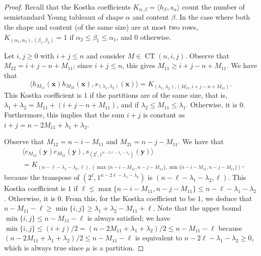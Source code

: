 \documentclass[12pt]{amsart}
\theoremstyle{plain}
\theoremstyle{definition}
\DeclareMathOperator{\CT}{CT}
\newcommand{\x}{\mathbf{x}}
\newcommand{\y}{\mathbf{y}}
\begin{document}
\begin{proof}
Recall that the Kostka coefficients $K_{\alpha,\beta} = \langle h_\beta, s_\alpha \rangle$ count the number of semistandard Young tableaux of shape $\alpha$ and content $\beta$. 
In the case where both the shape and content (of the same size) are at most two rows, $K_{(\alpha_1,\alpha_2),(\beta_1, \beta_2)} = 1$ if $\alpha_2 \leq \beta_1 \leq \alpha_1$, and $0$ otherwise.

Let $i, j \geq 0$ with $i + j \leq n$ and consider $M \in \CT(n,i,j)$.
Observe that $M_{22} = i+j - n + M_{11}$; since $i + j \leq n$, this gives $M_{11} \geq i+j - n + M_{11}$.
We have that 
\begin{equation}
    \langle h_{M_{11}}(\x)h_{M_{22}}(\x), s_{(\lambda_1,\lambda_2)} (\x) \rangle = K_{(\lambda_1,\lambda_2),(M_{11}, i+j-n+M_{11})}.
\end{equation}
This Kostka coefficient is $1$ if the partitions are of the same size, that is, $\lambda_1 + \lambda_2 = M_{11} + (i+j-n+M_{11})$, and if $\lambda_2 \leq M_{11} \leq \lambda_1$. 
Otherwise, it is $0$. 
Furthermore, this implies that the sum $i+j$ is constant as $i+j = n-2M_{11} + \lambda_1 + \lambda_2$.

Observe that $M_{12} = n-i-M_{11}$ and $M_{21} = n-j-M_{11}$. We have that 
\begin{equation}
\begin{aligned}
    &\langle e_{M_{12}}(\y)e_{M_{21}}(\y), s_{(2^\ell, 1^{n-2\ell-\lambda_1-\lambda_2})} (\y) \rangle\\ 
    &= K_{(n-\ell-\lambda_1-\lambda_2, \ell),(\max\{n-i-M_{11}, n-j-M_{11}\},\min\{n-i-M_{11}, n-j-M_{11}\} )},
\end{aligned}    
\end{equation}
because the transpose of $(2^\ell, 1^{n-2\ell-\lambda_1-\lambda_2})$ is $(n-\ell-\lambda_1-\lambda_2, \ell)$. 
This Kostka coefficient is $1$ if $\ell \leq \max\{n-i-M_{11}, n-j-M_{11}\} \leq n - \ell - \lambda_1 - \lambda_2$. 
Otherwise, it is $0$. 
From this, for the Kostka coefficient to be $1$, we deduce that $n - M_{11} - \ell \geq \min\{i,j\} \geq \lambda_1 + \lambda_2 -M_{11} + \ell$.
Note that the upper bound $\min\{i,j\} \leq n - M_{11} - \ell$ is always satisfied; 
we have $\min\{i,j\} \leq (i+j)/2 = (n-2M_{11} + \lambda_1+ \lambda_2)/2 \leq n-M_{11}-\ell$ because $(n-2M_{11} + \lambda_1+ \lambda_2)/2 \leq n-M_{11}-\ell$ is equivalent to $n-2\ell - \lambda_1 -\lambda_2 \geq 0$, which is always true since $\mu$ is a partition.


\end{proof}
\end{document}
